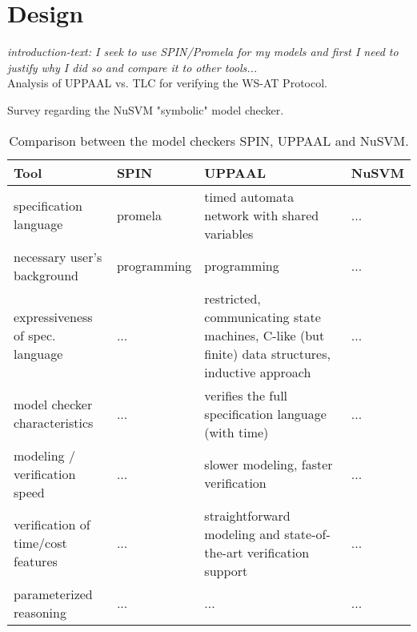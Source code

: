 \chapter{Design}


\textit{introduction-text: I seek to use SPIN/Promela for my models and first I need to justify why I did so and compare it to other tools...} \\



Analysis of UPPAAL vs. TLC for verifying the WS-AT Protocol. %




Survey regarding the NuSVM "symbolic" model checker.%



\begin{table}[H]
\centering
\begin{tabular}{| p{3cm} || p{3cm} | p{3cm} | p{3cm} |} \hline
Tool 
	& \textbf{SPIN} 
    & \textbf{UPPAAL}
    & \textbf{NuSVM}
    \\ \hline\hline
specification language 
	& promela
    & timed automata network with shared variables
    & ...
    \\ \hline
necessary user's background 
	& programming
    & programming
    & ...
    \\ \hline
expressiveness of spec. language 
	& ...
    & restricted, communicating state machines, C-like (but finite) data structures, inductive approach
    & ...
    \\ \hline
model checker characteristics 
	& ...
    & verifies the full specification language (with time)
    & ...
    \\ \hline
modeling / verification speed 
	& ...
    & slower modeling, faster verification
    & ...
    \\ \hline
verification of time/cost features
	& ...
    & straightforward modeling and state-of-the-art verification support
    & ...
    \\ \hline
parameterized reasoning
	& ...
    & ...
    & ...
    \\ \hline
\end{tabular}
\caption{Comparison between the model checkers SPIN, UPPAAL and NuSVM.}%
\end{table}

